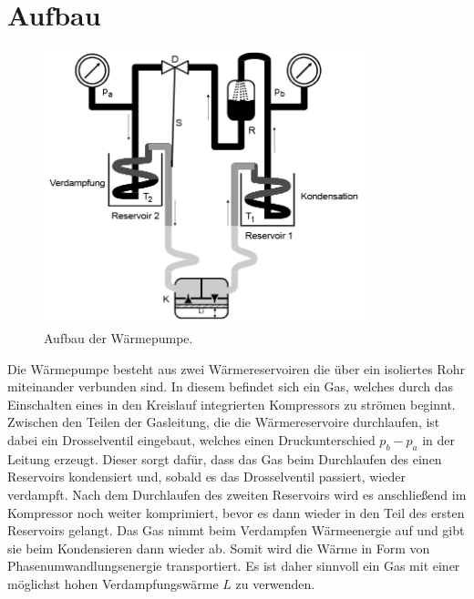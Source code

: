 \section{Aufbau}

\begin{figure}[H]
  \centering
  \includegraphics[height=8cm]{Waermepumpe.PNG}
  \caption{Aufbau der Wärmepumpe.}
  \label{fig:plot}
\end{figure}

Die Wärmepumpe besteht aus zwei Wärmereservoiren die über ein isoliertes
Rohr miteinander verbunden sind. In diesem befindet sich ein Gas, welches
durch das Einschalten eines in den Kreislauf integrierten Kompressors zu strömen
beginnt.\\
Zwischen den Teilen der Gasleitung, die die Wärmereservoire durchlaufen,
ist dabei ein Drosselventil eingebaut, welches einen Druckunterschied $p_b-p_a$
in der Leitung erzeugt. Dieser sorgt dafür, dass das Gas beim Durchlaufen
des einen Reservoirs kondensiert und, sobald es das Drosselventil passiert,
wieder verdampft. Nach dem Durchlaufen des zweiten Reservoirs wird es anschließend im Kompressor noch
weiter komprimiert, bevor es dann wieder in den Teil des ersten Reservoirs gelangt.
Das Gas nimmt beim Verdampfen Wärmeenergie auf und gibt sie beim Kondensieren
dann wieder ab. Somit wird die Wärme in Form von Phasenumwandlungsenergie transportiert.
Es ist daher sinnvoll ein Gas mit einer möglichst hohen Verdampfungswärme $L$
zu verwenden.

\label{sec:Aufbau}
